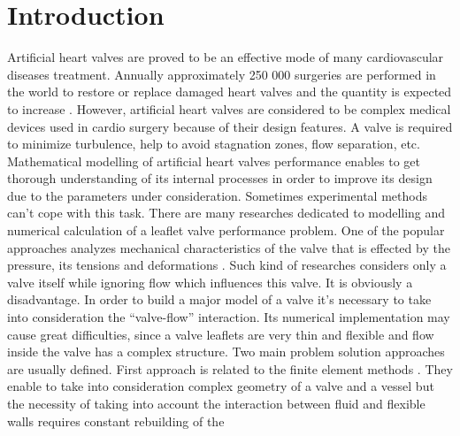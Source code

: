 \documentclass[conference]{IEEEtran}
\begin{document}




%
\IEEEpeerreviewmaketitle



\section{Introduction}
Artificial heart valves are proved to be an effective mode of many 
cardiovascular diseases treatment. Annually approximately 250 000 surgeries 
are performed in the world to restore or replace damaged heart valves and the 
quantity is expected to increase \cite{yacoub}. However, artificial heart valves are 
considered to be complex medical devices used in cardio surgery because of 
their design features. A valve is required to minimize turbulence, help to avoid 
stagnation zones, flow separation, etc.  Mathematical modelling of artificial 
heart valves performance enables to get thorough understanding of its internal 
processes in order to improve its design due to the parameters under 
consideration. Sometimes experimental methods can’t cope with this task.
There are many researches dedicated to modelling and numerical calculation of 
a leaflet valve performance problem. One of the popular approaches analyzes 
mechanical characteristics of the valve that is effected by the pressure, its 
tensions and deformations \cite{bokeria, kim}. Such kind of researches considers only a valve 
itself while ignoring flow which influences this valve. It is obviously a 
disadvantage. In order to build a major model of a valve it’s necessary to take 
into consideration the “valve-flow” interaction. Its numerical implementation 
may cause great difficulties, since a valve leaflets are very thin and flexible and 
flow inside the valve has a complex structure. Two main problem solution 
approaches are usually defined. First approach is related to the finite element 
methods \cite{zhang, black}. They enable to take into consideration complex geometry of 
a valve and a vessel but the necessity of taking into account the interaction 
between fluid and flexible walls requires constant rebuilding of the 
\end{document}
